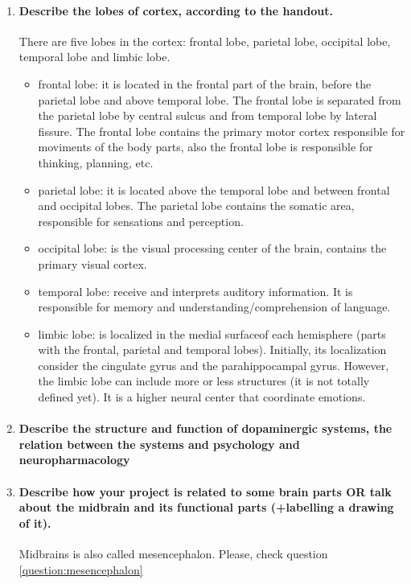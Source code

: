 \documentclass[12pt,article,oneside,a4paper]{memoir}
\begin{document}
\begin{enumerate}
\item \paragraph{Describe the lobes of cortex, according to the handout.} 
There are five lobes in the cortex: frontal lobe, parietal lobe, occipital lobe, temporal lobe and limbic lobe.
\begin{itemize}
\item frontal lobe: it is located in the frontal part of the brain, before the parietal lobe and above temporal lobe. The frontal lobe is separated from the parietal lobe by central sulcus and from temporal lobe by lateral fissure. The frontal lobe contains the primary motor cortex responsible for moviments of the body parts, also the frontal lobe is responsible for thinking, planning, etc.
\item parietal lobe: it is located above the temporal lobe and between frontal and occipital lobes. The parietal lobe contains the somatic area, responsible for sensations and perception.
\item occipital lobe: is the visual processing center of the brain, contains the primary visual cortex.
\item temporal lobe: receive and interprets auditory information. It is responsible for memory and understanding/comprehension of language.
\item limbic lobe: is localized in the medial surfaceof each hemisphere (parts with the frontal, parietal and temporal lobes). Initially, its localization consider the cingulate gyrus and the parahippocampal gyrus. However, the limbic lobe can include more or less structures (it is not totally defined yet). It is a higher neural center that coordinate emotions.
\end{itemize}

\item \paragraph{Describe the structure and function of dopaminergic systems, the relation between the systems and psychology and neuropharmacology}

\item \paragraph{Describe how your project is related to some brain parts OR talk about the midbrain and its functional parts (+labelling a drawing of it).}
Midbrains is also called mesencephalon. Please, check question \ref{question:mesencephalon}


\end{enumerate}
\end{document}
